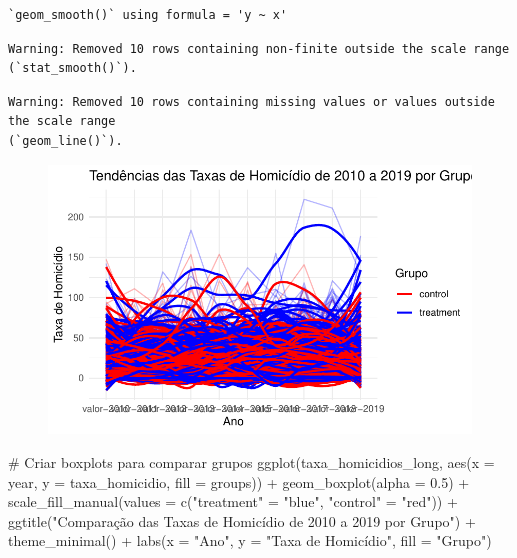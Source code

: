 \documentclass[
  letterpaper,
  DIV=11,
  numbers=noendperiod]{scrartcl}
\newenvironment{Shaded}{\begin{snugshade}}{\end{snugshade}}
\newcommand{\AttributeTok}[1]{\textcolor[rgb]{0.40,0.45,0.13}{#1}}
\newcommand{\CommentTok}[1]{\textcolor[rgb]{0.37,0.37,0.37}{#1}}
\newcommand{\FloatTok}[1]{\textcolor[rgb]{0.68,0.00,0.00}{#1}}
\newcommand{\FunctionTok}[1]{\textcolor[rgb]{0.28,0.35,0.67}{#1}}
\newcommand{\NormalTok}[1]{\textcolor[rgb]{0.00,0.23,0.31}{#1}}
\newcommand{\OtherTok}[1]{\textcolor[rgb]{0.00,0.23,0.31}{#1}}
\newcommand{\SpecialCharTok}[1]{\textcolor[rgb]{0.37,0.37,0.37}{#1}}
\newcommand{\StringTok}[1]{\textcolor[rgb]{0.13,0.47,0.30}{#1}}
\begin{document}
\begin{verbatim}
`geom_smooth()` using formula = 'y ~ x'
\end{verbatim}

\begin{verbatim}
Warning: Removed 10 rows containing non-finite outside the scale range
(`stat_smooth()`).
\end{verbatim}

\begin{verbatim}
Warning: Removed 10 rows containing missing values or values outside the scale range
(`geom_line()`).
\end{verbatim}

\begin{figure}[H]

{\centering \includegraphics{maps_files/figure-pdf/unnamed-chunk-21-1.pdf}

}

\end{figure}

\begin{Shaded}
\begin{Highlighting}[]
\CommentTok{\# Criar boxplots para comparar grupos}
\FunctionTok{ggplot}\NormalTok{(taxa\_homicidios\_long, }\FunctionTok{aes}\NormalTok{(}\AttributeTok{x =}\NormalTok{ year, }\AttributeTok{y =}\NormalTok{ taxa\_homicidio, }\AttributeTok{fill =}\NormalTok{ groups)) }\SpecialCharTok{+}
  \FunctionTok{geom\_boxplot}\NormalTok{(}\AttributeTok{alpha =} \FloatTok{0.5}\NormalTok{) }\SpecialCharTok{+}
  \FunctionTok{scale\_fill\_manual}\NormalTok{(}\AttributeTok{values =} \FunctionTok{c}\NormalTok{(}\StringTok{"treatment"} \OtherTok{=} \StringTok{"blue"}\NormalTok{, }\StringTok{"control"} \OtherTok{=} \StringTok{"red"}\NormalTok{)) }\SpecialCharTok{+}
  \FunctionTok{ggtitle}\NormalTok{(}\StringTok{"Comparação das Taxas de Homicídio de 2010 a 2019 por Grupo"}\NormalTok{) }\SpecialCharTok{+}
  \FunctionTok{theme\_minimal}\NormalTok{() }\SpecialCharTok{+}
  \FunctionTok{labs}\NormalTok{(}\AttributeTok{x =} \StringTok{"Ano"}\NormalTok{, }\AttributeTok{y =} \StringTok{"Taxa de Homicídio"}\NormalTok{, }\AttributeTok{fill =} \StringTok{"Grupo"}\NormalTok{)}
\end{Highlighting}
\end{Shaded}
\end{document}
